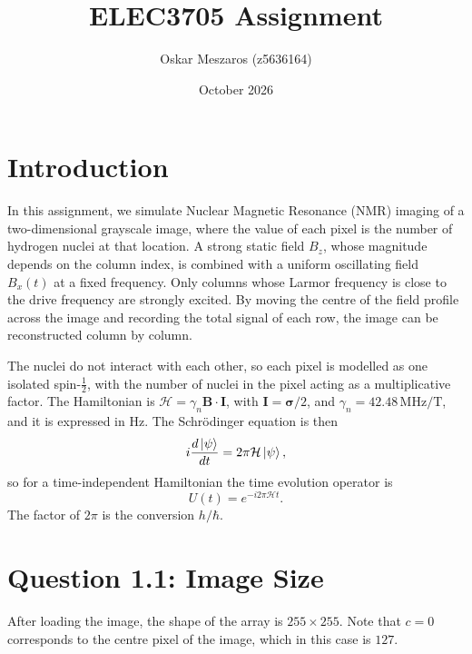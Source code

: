 \documentclass{article}
\title{ELEC3705 Assignment}
\author{Oskar Meszaros (z5636164)}
\date{October 2026}
\newcommand{\MHz}{\,\mathrm{MHz}}
\begin{document}
\maketitle

\section{Introduction}
In this assignment, we simulate Nuclear Magnetic Resonance (NMR) imaging of a two-dimensional grayscale image, where the value of each pixel is the number of hydrogen nuclei at that location. A strong static field $B_z$, whose magnitude depends on the column index, is combined with a uniform oscillating field $B_x(t)$ at a fixed frequency. Only columns whose Larmor frequency is close to the drive frequency are strongly excited. By moving the centre of the field profile across the image and recording the total signal of each row, the image can be reconstructed column by column.

The nuclei do not interact with each other, so each pixel is modelled as one isolated spin-$\tfrac12$, with the number of nuclei in the pixel acting as a multiplicative factor. The Hamiltonian is $\mathcal{H}=\gamma _n\mathbf{B}\cdot\mathbf{I}$, with $\mathbf{I}=\mathbf{\sigma }/2$, and $\gamma _n=42.48\MHz/\text{T}$, and it is expressed in Hz. The Schr\"odinger equation is then
\[
    i \frac{d \ket{\psi }}{d t}=2\pi \mathcal{H}\ket{\psi },
\]
so for a time-independent Hamiltonian the time evolution operator is
\begin{equation}
    U(t)=e^{-i2\pi \mathcal{H}t}. \label{eq:1}
\end{equation}
The factor of $2\pi $ is the conversion $h/\hbar$.

\section{Question 1.1: Image Size}
After loading the image, the shape of the array is $255 \times 255$. Note that $c=0$ corresponds to the centre pixel of the image, which in this case is $127$.
\end{document}
